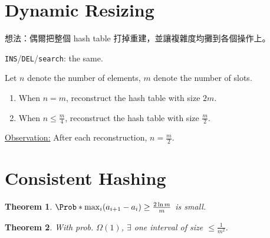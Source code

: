 \documentclass[a4paper]{article}
\theoremstyle{mystyle}
\newtheorem{theorem}{Theorem}
\begin{document}
\section{Dynamic Resizing}
想法：偶爾把整個 hash table 打掉重建，並讓複雜度均攤到各個操作上。

{\tt INS}/{\tt DEL}/{\tt search}: the same.

Let $n$ denote the number of elements, $m$ denote the number of slots.

\begin{enumerate}
  \item When $n = m$, reconstruct the hash table with size $2m$.
  \item When $n \le \frac{m}{4}$, reconstruct the hash table with size $\frac{m}{2}$.
\end{enumerate}

\underline{Observation:} After each reconstruction, $n = \frac{m}{2}$.

\section{Consistent Hashing}
\begin{theorem}
  $\Prob*{\max_i (a_{i+1} - a_i) \ge \frac{2 \ln m}{m}}$ is small.
\end{theorem}
\begin{theorem}
  With prob. $\Omega(1)$, $\exists$ one interval of size $\le \frac{1}{m^2}$.
\end{theorem}
% 
% 
\end{document}
